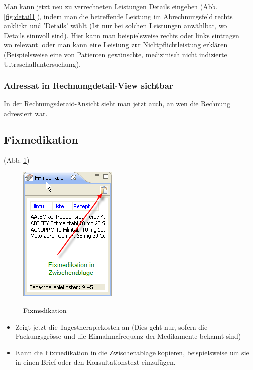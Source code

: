 \documentclass[a4paper]{scrartcl}
\begin{document}
Man kann jetzt neu zu verrechneten Leistungen Details eingeben (Abb. \ref{fig:detail1}), indem man die betreffende Leistung im Abrechnungsfeld rechts anklickt und 'Details' wählt (Ist nur bei solchen Leistungen anwählbar, wo Details sinnvoll sind). Hier kann man beispielsweise rechts oder links eintragen wo relevant, oder man kann eine Leistung zur Nichtpflichtleistung erklären (Beispielsweise eine von Patienten gewünschte, medizinisch nicht indizierte Ultraschalluntersuchung).

\subsubsection{Adressat in Rechnungdetail-View sichtbar}
In der Rechnungsdetaiö-Ansicht sieht man jetzt auch, an wen die Rechnung adressiert war.

\subsection{Fixmedikation}
(Abb. \ref{fig:fixmedi})
\begin{figure}
  \includegraphics{fixmedi3}\\
  \caption{Fixmedikation}\label{fig:fixmedi}
\end{figure}

\begin{itemize}
\item Zeigt jetzt die Tagestherapiekosten an (Dies geht nur, sofern die Packungsgrösse und die Einnahmefrequenz der Medikamente bekannt sind)
\item Kann die Fixmedikation in die Zwischenablage kopieren, beispielsweise um sie in einen Brief oder den Konsultationstext einzufügen.
\end{itemize}
\end{document}
